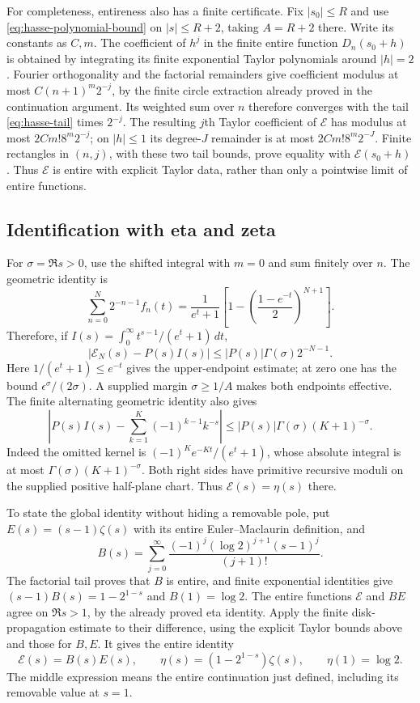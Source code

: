 For completeness, entireness also has a finite certificate.  Fix
$|s_0|\le R$ and use \eqref{eq:hasse-polynomial-bound} on
$|s|\le R+2$, taking $A=R+2$ there.  Write its constants as $C,m$.
The coefficient of $h^j$ in the finite entire function $D_n(s_0+h)$
is obtained by integrating its finite exponential Taylor polynomials
around $|h|=2$.  Fourier orthogonality and the factorial remainders give
coefficient modulus at most $C(n+1)^m2^{-j}$, by the finite circle
extraction already proved in the continuation argument.
Its weighted sum over $n$ therefore converges with the tail
\eqref{eq:hasse-tail} times $2^{-j}$.  The resulting $j$th Taylor
coefficient of $\mathcal{E}$ has modulus at most $2Cm!8^m2^{-j}$; on
$|h|\le1$ its degree-$J$ remainder is at most
$2Cm!8^m2^{-J}$.  Finite rectangles in $(n,j)$, with these two tail
bounds, prove equality with $\mathcal{E}(s_0+h)$.  Thus $\mathcal{E}$ is entire with
explicit Taylor data, rather than only a pointwise limit of entire
functions.

\subsection{Identification with eta and zeta}

For $\sigma=\Re s>0$, use the shifted integral with $m=0$ and sum
finitely over $n$.  The geometric identity is
\[
 \sum_{n=0}^N2^{-n-1}f_n(t)
 =\frac1{e^t+1}\left[1-
                  \left(\frac{1-e^{-t}}2\right)^{N+1}\right].
\tag{EH4}
\]
Therefore, if $I(s)=\int_0^\infty t^{s-1}/(e^t+1)\,dt$,
\[
 |\mathcal{E}_N(s)-P(s)I(s)|
       \le |P(s)|\Gamma(\sigma)2^{-N-1}.            \tag{EH5}
\]
Here $1/(e^t+1)\le e^{-t}$ gives the upper-endpoint estimate;
at zero one has the bound $\epsilon^\sigma/(2\sigma)$.
A supplied margin $\sigma\ge1/A$ makes both endpoints effective.
The finite alternating geometric identity also gives
\[
 \left|P(s)I(s)-\sum_{k=1}^K(-1)^{k-1}k^{-s}\right|
       \le |P(s)|\Gamma(\sigma)(K+1)^{-\sigma}.     \tag{EH6}
\]
Indeed the omitted kernel is $(-1)^K e^{-Kt}/(e^t+1)$, whose
absolute integral is at most
$\Gamma(\sigma)(K+1)^{-\sigma}$.  Both right sides have primitive
recursive moduli on the supplied positive half-plane chart.  Thus
$\mathcal{E}(s)=\eta(s)$ there.

To state the global identity without hiding a removable pole, put
$E(s)=(s-1)\zeta(s)$ with its entire Euler--Maclaurin definition, and
\[
 B(s)=\sum_{j=0}^{\infty}
       \frac{(-1)^j(\log2)^{j+1}(s-1)^j}{(j+1)!}.
\]
The factorial tail proves that $B$ is entire, and finite exponential
identities give $(s-1)B(s)=1-2^{1-s}$ and $B(1)=\log2$.
The entire functions $\mathcal{E}$ and $BE$ agree on $\Re s>1$, by the already
proved eta identity.  Apply the finite disk-propagation estimate to
their difference, using the explicit Taylor bounds above and those
for $B,E$.  It gives the entire identity
\begin{equation}
 \boxed{\displaystyle
 \mathcal{E}(s)=B(s)E(s),\qquad
 \eta(s)=(1-2^{1-s})\zeta(s),\qquad \eta(1)=\log2.}
 \label{eq:hasse-entire-eta}
\end{equation}
The middle expression means the entire continuation just defined,
including its removable value at $s=1$.

